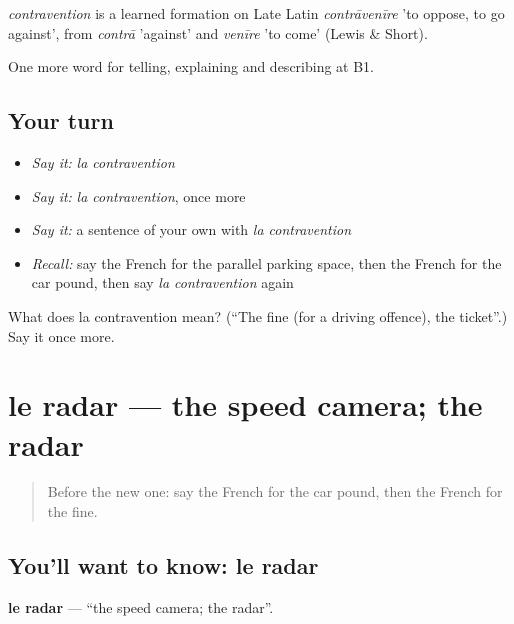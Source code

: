 \begin{cousinweb}
\emph{contravention} is a learned formation on Late Latin \emph{contrāvenīre} 'to oppose, to go against', from \emph{contrā} 'against' and \emph{venīre} 'to come' (Lewis \& Short).
\end{cousinweb}

\begin{grammarlens}[title={What you've built}]
One more word for telling, explaining and describing at B1.
\end{grammarlens}

\subsection*{Your turn}
\begin{itemize}
\raggedright
  \item \emph{Say it:} \emph{la contravention}
  \item \emph{Say it:} \emph{la contravention}, once more
  \item \emph{Say it:} a sentence of your own with \emph{la contravention}
  \item \emph{Recall:} say the French for the parallel parking space, then the French for the car pound, then say \emph{la contravention} again
\end{itemize}

\begin{tcolorbox}[breakable,colback=teal!4,colframe=teal!35!black,title={Before you move on}]
What does la contravention mean? (\textquotedblleft{}The fine (for a driving offence), the ticket\textquotedblright{}.) Say it once more.
\end{tcolorbox}
\section[le radar]{le radar — the speed camera; the radar}

\label{lesson:FR-C408-radar}



\begin{quote}
Before the new one: say the French for the car pound, then the French for the fine.
\end{quote}

\subsection*{You'll want to know: le radar}
\textbf{le radar} — \textquotedblleft{}the speed camera; the radar\textquotedblright{}.

